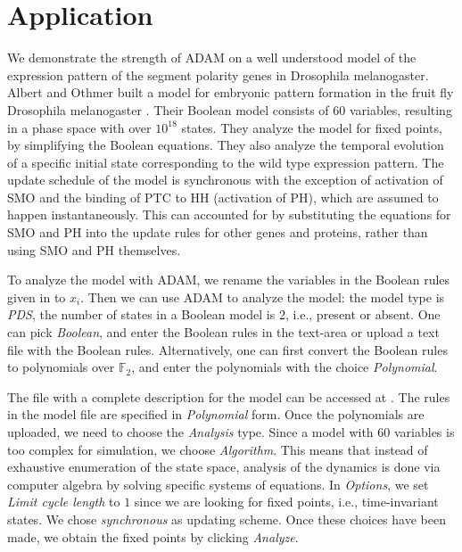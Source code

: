 \documentclass[11pt]{amsart}
\begin{document}
\section{Application} \label{benchmarks}
We demonstrate the strength of ADAM on a well understood model of the expression
pattern of the segment polarity genes in Drosophila melanogaster. Albert and Othmer built a model for embryonic pattern formation in the fruit fly Drosophila melanogaster \cite{AO}. Their Boolean
model consists of 60 variables, resulting in a phase
space with over $10^{18}$ states. They analyze the model for fixed points, by simplifying the Boolean equations. They also analyze the temporal evolution of a specific initial state corresponding to the wild type expression pattern. The update schedule of the model is synchronous  with the exception of activation of SMO and the binding of PTC to HH (activation of PH), which are assumed to happen instantaneously. This can accounted for by substituting the equations for SMO and PH into the update rules for other genes and proteins, rather than using SMO and PH themselves. 
 
To analyze the model with ADAM, we rename the variables in the Boolean rules given in \cite{AO} to $x_i$. Then we can use ADAM to analyze the model: the model type is {\it PDS}, the number of states in a Boolean model is $2$, i.e., present or absent. One can pick {\it Boolean}, and enter the Boolean rules in the text-area or upload a text file with the Boolean rules. Alternatively, one can first convert the Boolean rules to polynomials over $\mathbb F_2$, and enter the polynomials with the choice {\it Polynomial}. 
 
 
The file with a complete description for the model can be accessed at \cite{DrosophilaModel}. The rules in the model file are specified in {\it Polynomial} form. Once the polynomials are uploaded, we need to choose the {\it Analysis} type. Since a model with $60$ variables is too complex for simulation, we choose {\it Algorithm}. This means that instead of exhaustive enumeration of the state space, analysis of the dynamics is done via computer algebra by solving specific systems of equations. In {\it Options}, we set {\it Limit cycle length} to $1$ since we are looking for fixed points, i.e., time-invariant states. We chose {\it synchronous} as updating scheme. Once these choices have been made, we obtain the fixed points by clicking {\it Analyze}.
 
\end{document}
